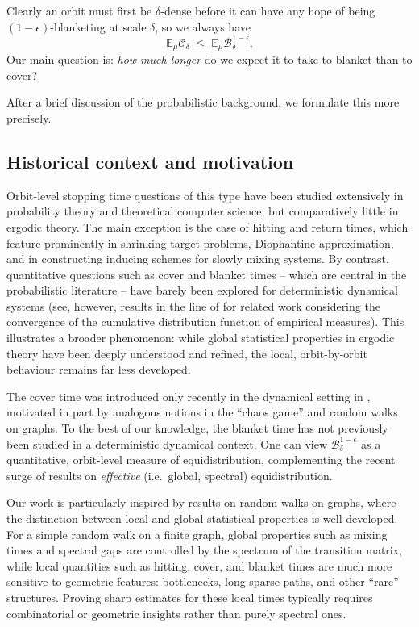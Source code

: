 \documentclass[11pt, reqno]{amsart}
\numberwithin{equation}{section}
\theoremstyle{plain}%
\theoremstyle{definition}
\def\B{\ensuremath{\mathcal B}}
\def\C{\ensuremath{\mathcal C}}
\renewcommand{\C}{\mathcal{C}}
\theoremstyle{nonumberplain}
\begin{document}
Clearly an orbit must first be $\delta$-dense before it can have any hope of being $(1-\epsilon)$-blanketing at scale $\delta$, so we always have
\[
  \mathbb{E}_\mu\C_\delta \;\leq\;
  \mathbb{E}_\mu \B_\delta^{1-\epsilon}.
\]
Our main question is: \emph{how much longer} do we expect it to take to blanket than to cover?

After a brief discussion of the probabilistic background, we formulate this more precisely.

\subsection{Historical context and motivation}

Orbit-level stopping time questions of this type have been studied extensively in probability theory and theoretical computer science, but comparatively little in ergodic theory. The main exception is the case of hitting and return times, which feature prominently in shrinking target problems, Diophantine approximation, and in constructing inducing schemes for slowly mixing systems. By contrast, quantitative questions such as cover and blanket times -- which are central in the probabilistic literature -- have barely been explored for deterministic dynamical systems (see, however, results in the line of \cite{DehTaq89} for related work considering the convergence of the cumulative distribution function of empirical measures). This illustrates a broader phenomenon: while global statistical properties in ergodic theory have been deeply understood and refined, the local, orbit-by-orbit behaviour remains far less developed.

The cover time was introduced only recently in the dynamical setting in \cite{JurTod25}, motivated in part by analogous notions in the ``chaos game'' and random walks on graphs. To the best of our knowledge, the blanket time has not previously been studied in a deterministic dynamical context. One can view $\B_{\delta}^{1-\epsilon}$ as a quantitative, orbit-level measure of equidistribution, complementing the recent surge of results on \emph{effective} (i.e.\ global, spectral) equidistribution.

Our work is particularly inspired by results on random walks on graphs, where the distinction between local and global statistical properties is well developed. For a simple random walk on a finite graph, global properties such as mixing times and spectral gaps are controlled by the spectrum of the transition matrix, while local quantities such as hitting, cover, and blanket times are much more sensitive to geometric features: bottlenecks, long sparse paths, and other ``rare'' structures. Proving sharp estimates for these local times typically requires combinatorial or geometric insights rather than purely spectral ones.
\end{document}
